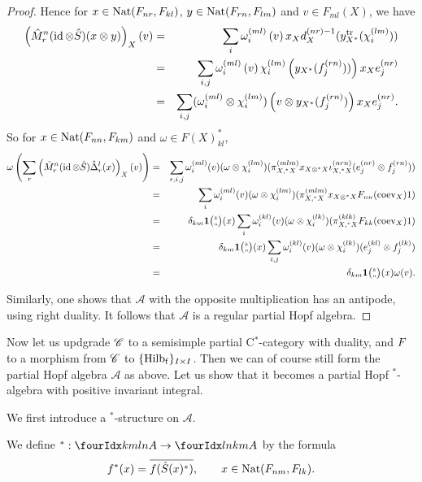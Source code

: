 \begin{proof}
Hence for $x\in \operatorname{\mathrm{Nat}}(F_{nr},F_{kl})$, $y\in \operatorname{\mathrm{Nat}}(F_{rn},F_{lm})$ and $v \in F_{ml}(X)$, we have \begin{eqnarray*} \left(\hat{M}^n_r(\operatorname{id}\otimes \hat{S})(x\otimes y)\right)_X(v) &=& \sum_i \omega_i^{(ml)}\left(v\right)  x_Xd_X^{(nr)-1}(y_{X^*}^{\operatorname{\mathrm{tr}}}(\chi_i^{(lm)}))\\ &=& \sum_{i,j} \omega_i^{(ml)}\left(v\right)  \chi_i^{(lm)}\left(y_{X^*}(f_j^{(rn)}))\right)x_Xe_j^{(nr)} \\ &=& \sum_{i,j}(\omega_i^{(ml)}\otimes \chi_i^{(lm)})\left(v\otimes y_{X^*}(f_j^{(rn)})\right)x_Xe_j^{(nr)}.\end{eqnarray*} So for $ x\in \operatorname{\mathrm{Nat}}(F_{nn},F_{km})$ and $\omega \in F(X)_{kl}^*$,  \begin{eqnarray*} \omega\left(\sum_r\left(\hat{M}^n_r(\operatorname{id}\otimes \hat{S})\hat{\Delta}^l_r(x)\right)_X(v) \right)&=& \sum_{r,i,j}
\omega_i^{(ml)}(v)(\omega\otimes \chi_i^{(lm)})(\pi_{X,{}^*X}^{(mlm)}x_{X\otimes {}^*X}\iota_{X,{}^*X}^{(nrn)}(e_j^{(nr)}\otimes f_j^{(rn)})) \\
&=&  \sum_{i}
\omega_i^{(ml)}(v)(\omega\otimes \chi_i^{(lm)})(\pi_{X,{}^*X}^{(mlm)}x_{X\otimes {}^*X}F_{nn}(\mathrm{coev}_X)1)\\ &=&  \delta_{km} \mathbf{1}{\tiny {\begin{pmatrix} k\\n\end{pmatrix}}}(x)  \sum_{i}
\omega_i^{(kl)}(v)(\omega\otimes \chi_i^{(lk)})(\pi_{X,{}^*X}^{(klk)}F_{kk}(\mathrm{coev}_X)1) \\ &=&  \delta_{km} \mathbf{1}{\tiny {\begin{pmatrix} k\\n\end{pmatrix}}}(x)  \sum_{i,j}
\omega_i^{(kl)}(v)(\omega\otimes \chi_i^{(lk)})(e_j^{(kl)}\otimes f_j^{(lk)}) \\ &=&  \delta_{km} \mathbf{1}{\tiny {\begin{pmatrix} k\\n\end{pmatrix}}}(x)  \omega(v).
\end{eqnarray*}

Similarly, one shows that $\mathscr{A}$ with the opposite multiplication has an antipode, using right duality. It follows that $\mathscr{A}$ is a regular partial Hopf algebra.  
\end{proof} 

Now let us updgrade $\mathscr{C}$ to a semisimple partial C$^*$-category with duality, and $F$ to a morphism from $\mathscr{C}$ to $\{\mathrm{Hilb}_{\operatorname{\mathrm{f}}}\}_{I\times I}$. Then we can of course still form the partial Hopf algebra $\mathscr{A}$ as above. Let us show that it becomes a partial Hopf $^*$-algebra with positive invariant integral.

We first introduce a $^*$-structure on $\mathscr{A}$. 

\begin{Def} We define $^*: \Gr{A}{k}{l}{m}{n}\rightarrow \Gr{A}{l}{k}{n}{m}$ by the formula \[f^*(x) = \overline{f(\hat{S}(x)^*)},\qquad x\in \operatorname{\mathrm{Nat}}(F_{nm},F_{lk}).\]
\end{Def}

